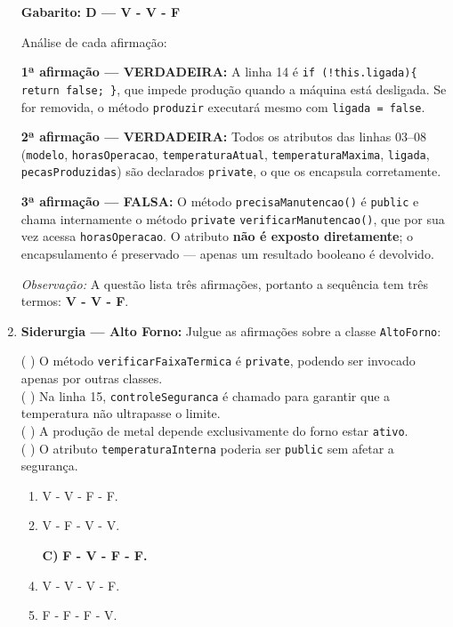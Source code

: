 \documentclass[12pt,a4paper]{article}
\begin{document}
\begin{enumerate}
\begin{tcolorbox}[respostabox]
\textbf{Gabarito: D — V - V - F}

Análise de cada afirmação:

\textbf{1ª afirmação — VERDADEIRA:} A linha 14 é \texttt{if (!this.ligada)\{ return false; \}}, que impede produção quando a máquina está desligada. Se for removida, o método \texttt{produzir} executará mesmo com \texttt{ligada = false}.

\textbf{2ª afirmação — VERDADEIRA:} Todos os atributos das linhas 03–08 (\texttt{modelo}, \texttt{horasOperacao}, \texttt{temperaturaAtual}, \texttt{temperaturaMaxima}, \texttt{ligada}, \texttt{pecasProduzidas}) são declarados \texttt{private}, o que os encapsula corretamente.

\textbf{3ª afirmação — FALSA:} O método \texttt{precisaManutencao()} é \texttt{public} e chama internamente o método \texttt{private} \texttt{verificarManutencao()}, que por sua vez acessa \texttt{horasOperacao}. O atributo \textbf{não é exposto diretamente}; o encapsulamento é preservado — apenas um resultado booleano é devolvido.

\textit{Observação:} A questão lista três afirmações, portanto a sequência tem três termos: \textbf{V - V - F}.
\end{tcolorbox}

\vspace{0.4cm}

\item \textbf{Siderurgia — Alto Forno:} Julgue as afirmações sobre a classe \texttt{AltoForno}:

( ) O método \texttt{verificarFaixaTermica} é \texttt{private}, podendo ser invocado apenas por outras classes. \\
( ) Na linha 15, \texttt{controleSeguranca} é chamado para garantir que a temperatura não ultrapasse o limite. \\
( ) A produção de metal depende exclusivamente do forno estar \texttt{ativo}. \\
( ) O atributo \texttt{temperaturaInterna} poderia ser \texttt{public} sem afetar a segurança.

    \begin{enumerate}[label=\Alph*)]
        \item V - V - F - F.
        \item V - F - V - V.
        \item[\textbf{C)}] \textbf{F - V - F - F.} \checkmark
        \item V - V - V - F.
        \item F - F - F - V.
    \end{enumerate}


\end{enumerate}
\end{document}
